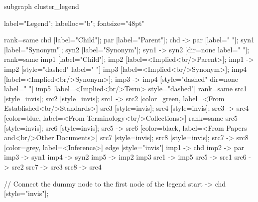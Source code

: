 \documentclass{article}
\begin{document}
{subgraph cluster_legend {

    label="Legend";
    labelloc="b";
    fontsize="48pt"

    {
        rank=same
        chd [label="Child"];
        par [label="Parent"];
        chd -> par [label="                "];
        syn1 [label="Synonym"];
        syn2 [label="Synonym"];
        syn1 -> syn2 [dir=none label="                "];
    }
    {
        rank=same
        imp1 [label="Child"];
        imp2 [label=<Implied<br/>Parent>];
        imp1 -> imp2 [style="dashed" label="                "]
        imp3 [label=<Implied<br/>Synonym>];
        imp4 [label=<Implied<br/>Synonym>];
        imp3 -> imp4 [style="dashed" dir=none label="                "]
    }
        imp5 [label=<Implied<br/>Term> style="dashed"]
{
rank=same
src1 [style=invis];
src2 [style=invis];
src1 -> src2 [color=green, label=<From Established<br/>Standards>]
src3 [style=invis];
src4 [style=invis];
src3 -> src4 [color=blue, label=<From Terminology<br/>Collections>]
}
{
rank=same
src5 [style=invis];
src6 [style=invis];
src5 -> src6 [color=black, label=<From Papers and<br/>Other Documents>]
src7 [style=invis];
src8 [style=invis];
src7 -> src8 [color=grey, label=<Inference>]
}
edge [style="invis"]
imp1 -> chd
imp2 -> par
imp3 -> syn1
imp4 -> syn2
imp5 -> { imp2 imp3 }
src1 -> imp5
src5 -> src1
src6 -> src2
src7 -> src3
src8 -> src4
}

// Connect the dummy node to the first node of the legend
start -> chd [style="invis"];
}
\end{document}
